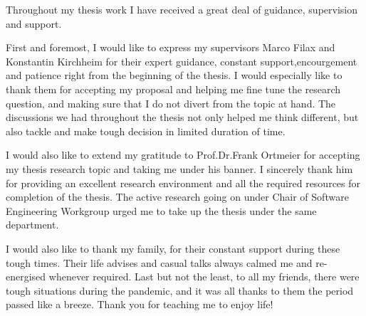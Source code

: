 \documentclass[
]{thesis}
\begin{document}
Throughout my thesis work I have received a great deal of guidance, supervision and support.

First and foremost, I would like to express my supervisors Marco Filax and Konstantin Kirchheim for their expert guidance, constant support,encourgement
and patience right from the beginning of the thesis.
I would especially like to thank them for accepting my proposal and helping me fine tune the research question, and making sure that I do not divert from the topic at hand.
The discussions we had throughout the thesis not only helped me think different, but also tackle and make tough decision in limited duration of time.

I would also like to extend my gratitude to Prof.Dr.Frank Ortmeier for accepting my thesis research topic and taking me under his banner.
I sincerely thank him for providing an excellent research environment and all the required resources for completion of the thesis.
The active research going on under Chair of Software Engineering Workgroup urged me to take up the thesis under the same department.

I would also like to thank my family, for their constant support during these tough times.
Their life advises and casual talks always calmed me and re-energised whenever required.
Last but not the least, to all my friends, there were tough situations during the pandemic, and it was all thanks to them the period passed like a breeze.
Thank you for teaching me to enjoy life!

\blankpage
{\parskip 0pt \pdfbookmark{\contentsname}{\contentsname}\chapterheadfont \tableofcontents}
\blankpage
\listoffigures
\listoftables
\lstlistoflistings
\glsaddall[types={symbol}]
\printglossary[type=acronym,
    title=\iftoggle{german}{Abkürzungsverzeichnis}{List of Acronyms},
    toctitle=\iftoggle{german}{Abkürzungsverzeichnis}{List of Acronyms}]
\printglossary[type=symbol,style=supergroup]

\mainmatter
{}






\appendix


\cleardoublepage
{}


\end{document}
